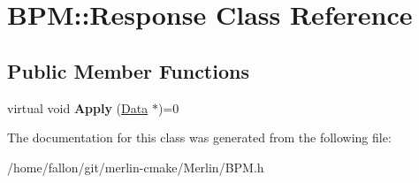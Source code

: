 \hypertarget{classBPM_1_1Response}{}\section{B\+PM\+:\+:Response Class Reference}
\label{classBPM_1_1Response}
\subsection*{Public Member Functions}
\begin{DoxyCompactItemize}
\item 
\mbox{\label{classBPM_1_1Response_adf3f1f24f8a224510b7988ebc9a05538}} 
virtual void {\bfseries Apply} (\hyperlink{structBPM_1_1Data}{Data} $\ast$)=0
\end{DoxyCompactItemize}


The documentation for this class was generated from the following file\+:\begin{DoxyCompactItemize}
\item 
/home/fallon/git/merlin-\/cmake/\+Merlin/B\+P\+M.\+h\end{DoxyCompactItemize}
